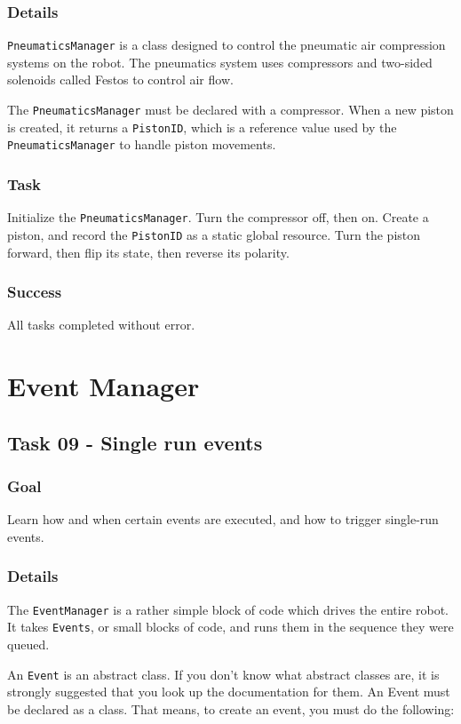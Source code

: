 \documentclass[a4paper]{article}
\begin{document}
\subsubsection{Details} \lstinline{PneumaticsManager} is a class designed to control the pneumatic air compression systems on the robot. The pneumatics system uses compressors and two-sided solenoids called Festos to control air flow.

The \lstinline{PneumaticsManager} must be declared with a compressor. When a new piston is created, it returns a \lstinline{PistonID}, which is a reference value used by the \lstinline{PneumaticsManager} to handle piston movements.
\subsubsection{Task} Initialize the \lstinline{PneumaticsManager}. Turn the compressor off, then on. Create a piston, and record the \lstinline{PistonID} as a static global resource. Turn the piston forward, then flip its state, then reverse its polarity.
\subsubsection{Success} All tasks completed without error.


\section{Event Manager}\setcounter{subsection}{8}

\subsection{Task 09 - Single run events}
\subsubsection{Goal} Learn how and when certain events are executed, and how to trigger single-run events.
\subsubsection{Details} The \lstinline{EventManager} is a rather simple block of code which drives the entire robot. It takes \lstinline{Events}, or small blocks of code, and runs them in the sequence they were queued.

An \lstinline{Event} is an abstract class. If you don't know what abstract classes are, it is strongly suggested that you look up the documentation for them. An Event must be declared as a class. That means, to create an event, you must do the following:
\end{document}
